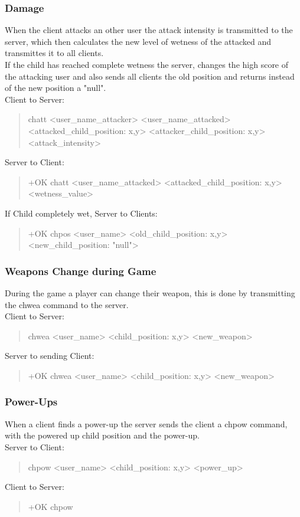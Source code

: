 \documentclass[a4paper,11pt]{article}
\begin{document}
\subsubsection{Damage}
When the client attacks an other user the attack intensity is transmitted to the server, which then calculates the new level of wetness of the attacked and transmittes it to all clients.\\
If the child has reached complete wetness the server, changes the high score of the attacking user and also sends all clients the old position and returns instead of the new position a "null".\\
Client to Server:
\begin{quote}
  chatt <user\_name\_attacker> <user\_name\_attacked> <attacked\_child\_position: x,y> <attacker\_child\_position: x,y> <attack\_intensity>
\end{quote}
\noindent
Server to Client:
\begin{quote}
  +OK chatt <user\_name\_attacked> <attacked\_child\_position: x,y> <wetness\_value>
\end{quote}
\noindent
If Child  completely wet, Server to Clients:
\begin{quote}
  +OK chpos <user\_name> <old\_child\_position: x,y> <new\_child\_position: "null">
\end{quote}


\subsubsection{Weapons Change during Game}
During the game a player can change their weapon, this is done by transmitting the chwea command to the server.\\
Client to Server:
\begin{quote}
  chwea <user\_name> <child\_position: x,y> <new\_weapon>
\end{quote}
\noindent
Server to sending Client:
\begin{quote}
  +OK chwea <user\_name> <child\_position: x,y> <new\_weapon>
\end{quote}

\subsubsection{Power-Ups}
When a client finds a power-up the server sends the client a chpow command, with the powered up child position and the power-up.\\
Server to Client:
\begin{quote}
  chpow <user\_name> <child\_position: x,y> <power\_up>
\end{quote}
\noindent
Client to Server:
\begin{quote}
  +OK chpow
\end{quote}
\end{document}
